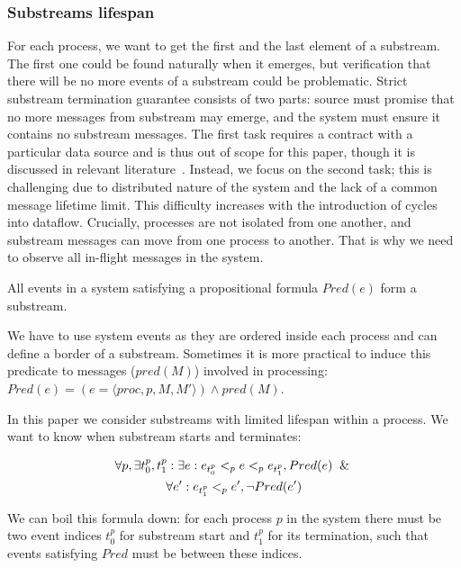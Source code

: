 \subsubsection{Substreams lifespan}

For each process, we want to get the first and the last element of a substream. The first one could be found naturally when it emerges, but verification that there will be no more events of a substream could be problematic. Strict substream termination guarantee consists of two parts: source must promise that no more messages from substream may emerge, and the system must ensure it contains no substream messages. The first task requires a contract with a particular data source and is thus out of scope for this paper, though it is discussed in relevant literature~\cite{awad2019adaptive}. Instead, we focus on the second task; this is challenging due to distributed nature of the system and the lack of a common message lifetime limit. This difficulty increases with the introduction of cycles into dataflow. Crucially, processes are not isolated from one another, and substream messages can move from one process to another. That is why we need to observe all in-flight messages in the system.

\begin{definition}[Substream]
All events in a system satisfying a propositional formula $Pred(e)$ form a substream.
\end{definition}

We have to use system events as they are ordered inside each process and can define a border of a substream. Sometimes it is more practical to induce this predicate to messages ($pred(M)$) involved in processing: $Pred(e) = (e = \langle proc, p, M, M'\rangle) \wedge pred(M)$.

In this paper we consider substreams with limited lifespan within a process. We want to know when substream starts and terminates: 

\begin{multline}
\forall p, \exists t_0^p, t_1^p: \exists e: e_{t_0^p} <_p e <_p e_{t_1^p}, Pred(e) \And \\ \forall e': e_{t_1^p} <_p e', \neg Pred(e') 
\end{multline}

We can boil this formula down: for each process $p$ in the system there must be two event indices $t_0^p$ for substream start and $t_1^p$ for its termination, such that events satisfying $Pred$ must be between these indices. 

